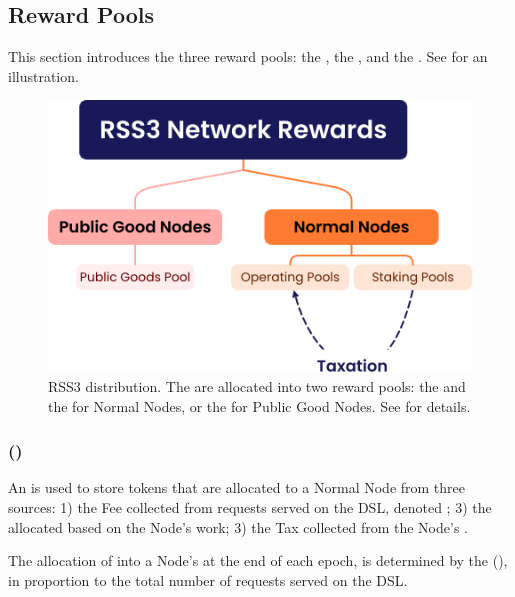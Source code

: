 \subsection{Reward Pools}
\label{subsec:reward_pools}

This section introduces the three reward pools: the , the , and the . See  for an illustration.

{
\begin{figure}[tb!]
    \centering
    \includegraphics[width=0.9\columnwidth]{figures/network-rewards.png}
    \caption{RSS3  distribution.
    The  are allocated into two reward pools: the  and the  for Normal Nodes, or the  for Public Good Nodes.
    See  for details.}
    \label{fig:network-rewards}
\end{figure}
}

\subsubsection{ ()}
\label{subsubsec:operating_pool}

An  is used to store tokens that are allocated to a Normal Node from three sources: 1) the \gls{Fee} collected from requests served on the \gls{DSL}, denoted ; 3) the  allocated based on the Node’s work; 3) the \gls{Tax} collected from the Node's .

The allocation of  into a Node's  at the end of each epoch, is determined by the  (), in proportion to the total number of requests served on the \gls{DSL}.

